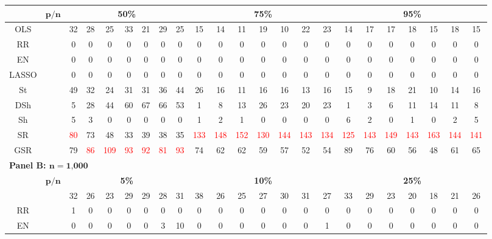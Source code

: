 \begin{table}
{\begin{tabular*}{\textwidth}{@{\extracolsep{\fill}}cc|ccccccc|ccccccc|ccccccc@{}}
\hline
\multirow{2}{*}{} & $\bm{p/n}$ & \multicolumn{7}{c|}{\textbf{50\%}} & \multicolumn{7}{c|}{\textbf{75\%}} & \multicolumn{7}{c}{\textbf{95\%}} \\
\hline
OLS &  & 32 & 28 & 25 & 33 & 21 & 29 & 25 & 15 & 14 & 11 & 19 & 10 & 22 & 23 & 14 & 17 & 17 & 18 & 15 & 18 & 15 \\
RR &  & 0 & 0 & 0 & 0 & 0 & 0 & 0 & 0 & 0 & 0 & 0 & 0 & 0 & 0 & 0 & 0 & 0 & 0 & 0 & 0 & 0 \\
EN &  & 0 & 0 & 0 & 0 & 0 & 0 & 0 & 0 & 0 & 0 & 0 & 0 & 0 & 0 & 0 & 0 & 0 & 0 & 0 & 0 & 0 \\
LASSO &  & 0 & 0 & 0 & 0 & 0 & 0 & 0 & 0 & 0 & 0 & 0 & 0 & 0 & 0 & 0 & 0 & 0 & 0 & 0 & 0 & 0 \\
St &  & 49 & 32 & 24 & 31 & 31 & 36 & 44 & 26 & 16 & 11 & 16 & 16 & 13 & 16 & 15 & 9 & 18 & 21 & 10 & 14 & 16 \\
DSh &  & 5 & 28 & 44 & 60 & 67 & 66 & 53 & 1 & 8 & 13 & 26 & 23 & 20 & 23 & 1 & 3 & 6 & 11 & 14 & 11 & 8 \\
Sh &  & 5 & 3 & 0 & 0 & 0 & 0 & 0 & 1 & 2 & 1 & 0 & 0 & 0 & 0 & 6 & 2 & 0 & 1 & 0 & 2 & 5 \\
SR &  & \textcolor{red}{80} & 73 & 48 & 33 & 39 & 38 & 35 & \textcolor{red}{133} & \textcolor{red}{148} & \textcolor{red}{152} & \textcolor{red}{130} & \textcolor{red}{144} & \textcolor{red}{143} & \textcolor{red}{134} & \textcolor{red}{125} & \textcolor{red}{143} & \textcolor{red}{149} & \textcolor{red}{143} & \textcolor{red}{163} & \textcolor{red}{144} & \textcolor{red}{141} \\
GSR &  & 79 & \textcolor{red}{86} & \textcolor{red}{109} & \textcolor{red}{93} & \textcolor{red}{92} & \textcolor{red}{81} & \textcolor{red}{93} & 74 & 62 & 62 & 59 & 57 & 52 & 54 & 89 & 76 & 60 & 56 & 48 & 61 & 65 \\
\hline
\multicolumn{23}{l}{\textbf{Panel B: $\bm{n}=\textbf{1,000}$}} \\
\hline
\multirow{2}{*}{} & $\bm{p/n}$ & \multicolumn{7}{c|}{\textbf{5\%}} & \multicolumn{7}{c|}{\textbf{10\%}} & \multicolumn{7}{c}{\textbf{25\%}} \\
\hline
OLS &  & 32 & 26 & 23 & 29 & 29 & 28 & 31 & 38 & 26 & 25 & 27 & 30 & 31 & 27 & 33 & 29 & 23 & 20 & 18 & 21 & 26 \\
RR &  & 1 & 0 & 0 & 0 & 0 & 0 & 0 & 0 & 0 & 0 & 0 & 0 & 0 & 0 & 0 & 0 & 0 & 0 & 0 & 0 & 0 \\
EN &  & 0 & 0 & 0 & 0 & 0 & 3 & 10 & 0 & 0 & 0 & 0 & 0 & 0 & 1 & 0 & 0 & 0 & 0 & 0 & 0 & 0 \\

\end{tabular*}}
\end{table}
